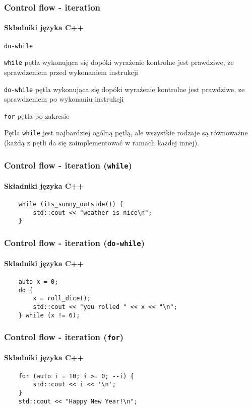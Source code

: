 \documentclass[aspectratio=169]{beamer}
\begin{document}
\begin{frame}
    \frametitle{Control flow - iteration}
    \framesubtitle{Składniki języka C++}

    \begin{labeling}{{\tt do-while}}
        \item[{\tt while}] pętla wykonująca się dopóki wyrażenie kontrolne jest
            prawdziwe, ze sprawdzeniem przed wykonaniem instrukcji
        \item[{\tt do-while}] pętla wykonująca się dopóki wyrażenie kontrolne
            jest prawdziwe, ze sprawdzeniem po wykonaniu instrukcji
        \item[{\tt for}] pętla po zakresie
    \end{labeling}

    \vspace{1em}

    Pętla {\tt while} jest najbardziej ogólną pętlą, ale wszystkie rodzaje są
    równoważne (każdą z pętli da się zaimplementować w ramach każdej innej).
\end{frame}

\begin{frame}[fragile]
    \frametitle{Control flow - iteration ({\tt while})}
    \framesubtitle{Składniki języka C++}

    \begin{lstlisting}
    while (its_sunny_outside()) {
        std::cout << "weather is nice\n";
    }
    \end{lstlisting}
\end{frame}

\begin{frame}[fragile]
    \frametitle{Control flow - iteration ({\tt do-while})}
    \framesubtitle{Składniki języka C++}

    \begin{lstlisting}
    auto x = 0;
    do {
        x = roll_dice();
        std::cout << "you rolled " << x << "\n";
    } while (x != 6);
    \end{lstlisting}
\end{frame}

\begin{frame}[fragile]
    \frametitle{Control flow - iteration ({\tt for})}
    \framesubtitle{Składniki języka C++}

    \begin{lstlisting}
    for (auto i = 10; i >= 0; --i) {
        std::cout << i << '\n';
    }
    std::cout << "Happy New Year!\n";
    \end{lstlisting}
\end{frame}
\end{document}
